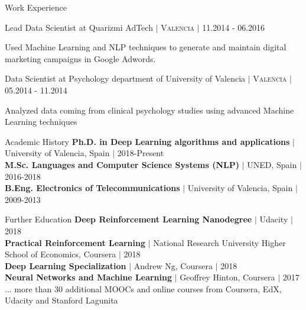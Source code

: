 \documentclass{resume} %
\begin{document}
\begin{rSection}{ Work Experience }
\begin{rSubsection}{Lead Data Scientist at Quarizmi AdTech  $|$  \textnormal{\textsc{Valencia}} $|$ \textnormal{11.2014 - 06.2016}}{}{}
    
    \vspace{-3pt}
    
    \item Used Machine Learning and NLP techniques to generate and maintain digital marketing campaigns in Google Adwords.
\end{rSubsection} 

\vspace{-6pt}

\begin{rSubsection}{Data Scientist at Psychology department of University of Valencia  $|$  \textnormal{\textsc{Valencia}} $|$ \textnormal{05.2014 - 11.2014}}{}{}

    \vspace{-3pt}
    
    \item Analyzed data coming from clinical psychology studies using advanced Machine Learning techniques

\end{rSubsection}


\end{rSection}


\begin{rSection}{Academic History}
{\textbf{Ph.D. in Deep Learning algorithms and applications}  $|$  University of Valencia, Spain} $|$ {2018-Present}
\\
{\textbf{M.Sc. Languages and Computer Science Systems (NLP)}  $|$  UNED, Spain} $|$  {2016-2018}
\\
{\textbf{B.Eng. Electronics of Telecommunications}  $|$ University of Valencia, Spain} $|$  {2009-2013}
\end{rSection}

\begin{rSection}{Further Education}
{\textbf{Deep Reinforcement Learning Nanodegree}  $|$  Udacity} $|$  {2018}\\
{\textbf{Practical Reinforcement Learning}  $|$  National Research University Higher School of Economics, Coursera} $|$  {2018}\\
{\textbf{Deep Learning Specialization}  $|$  Andrew Ng, Coursera} $|$  {2018}\\
{\textbf{Neural Networks and Machine Learning}  $|$  Geoffrey Hinton, Coursera $|$  {2017}}\\
{... more than 30 additional MOOCs and online courses from Coursera, EdX, Udacity and Stanford Lagunita}
\end{rSection}
\end{document}
